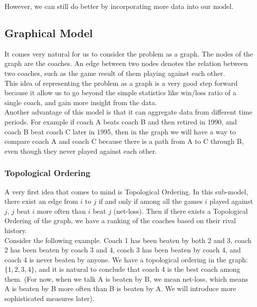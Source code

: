 \documentclass[titlepage]{article}
\begin{document}
\noindent However, we can still do better by incorporating more data into our model.

\subsection{Graphical Model}
It comes very natural for us to consider the problem as a graph. The nodes of the graph are the coaches. An edge between two nodes denotes the relation between two coaches, such as the game result of them playing against each other.
\\

\noindent This idea of representing the problem as a graph is a very good step forward because it allow us to go beyond the simple statistics like win/loss ratio of a single coach, and gain more insight from the data.
\\

\noindent Another advantage of this model is that it can aggregate data from different time periods. For example if coach A beats coach B and then retired in 1990, and coach B beat coach C later in 1995, then in the graph we will have a way to compare coach A and coach C because there is a path from A to C through B, even though they never played against each other.

\subsubsection{Topological Ordering}
A very first idea that comes to mind is Topological Ordering. In this sub-model, there exist an edge from $i$ to $j$ if and only if among all the games $i$ played against $j$, $j$ beat $i$ more often than $i$ beat $j$ (net-loss). Then if there exists a Topological Ordering of the graph, we have a ranking of the coaches based on their rival history.
\\

\noindent Consider the following example. Coach 1 has been beaten by both 2 and 3, coach 2 has been beaten by coach 3 and 4, coach 3 has been beaten by coach 4, and coach 4 is never beaten by anyone. We have a topological ordering in the graph: $\{1, 2, 3, 4\}$, and it is natural to conclude that coach 4 is the best coach among them. (For now, when we talk A is beaten by B, we mean net-loss, which means A is beaten by B more often than B is beaten by A. We will introduce more sophisticated measures later).
\end{document}
